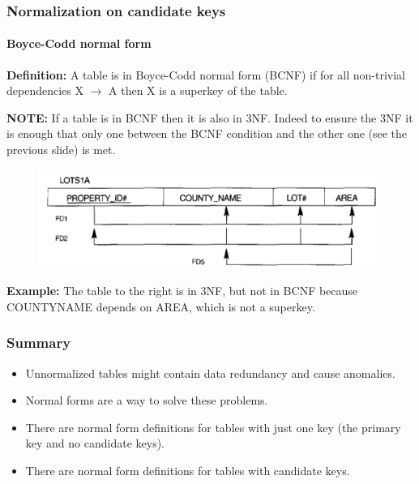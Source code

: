 \documentclass{beamer}
\newcommand{\fdep}[2]{#1 $\rightarrow$ #2}
\begin{document}
\begin{frame}
	\frametitle{Normalization on candidate keys}
	\framesubtitle{Boyce-Codd normal form}
	
	\textbf{Definition:} A table is in Boyce-Codd normal form (BCNF) if for all non-trivial dependencies \fdep{X}{A} then X is a superkey of the table.
	
	\textbf{NOTE:} If a table is in BCNF then it is also in 3NF. Indeed to ensure the 3NF it is enough that only one between the BCNF condition and the other one (see the previous slide) is met.
	
	\begin{figure}
		\begin{center}
			\includegraphics[scale=0.4]{img/normalization/norm13b}
		\end{center}
	\end{figure}
	
	\textbf{Example:} The table to the right is in 3NF, but not in BCNF because COUNTY\textunderscore NAME depends on AREA, which is not a superkey.
	
\end{frame}


\begin{frame}
	\frametitle{Summary}
	\begin{itemize}
		\item Unnormalized tables might contain data redundancy and cause anomalies.
		\item Normal forms are a way to solve these problems.
		\item There are normal form definitions for tables with just one key (the primary key and no candidate keys).
		\item There are normal form definitions for tables with candidate keys.
	\end{itemize}
\end{frame}
\end{document}

